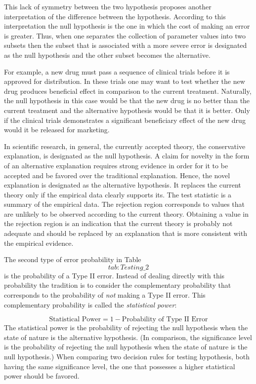 \documentclass[]{krantz}
\theoremstyle{definition}
\theoremstyle{definition}
\theoremstyle{definition}
\theoremstyle{remark}
\begin{document}
This lack of symmetry between the two hypothesis proposes another
interpretation of the difference between the hypothesis. According to
this interpretation the null hypothesis is the one in which the cost of
making an error is greater. Thus, when one separates the collection of
parameter values into two subsets then the subset that is associated
with a more severe error is designated as the null hypothesis and the
other subset becomes the alternative.

For example, a new drug must pass a sequence of clinical trials before
it is approved for distribution. In these trials one may want to test
whether the new drug produces beneficial effect in comparison to the
current treatment. Naturally, the null hypothesis in this case would be
that the new drug is no better than the current treatment and the
alternative hypothesis would be that it is better. Only if the clinical
trials demonstrates a significant beneficiary effect of the new drug
would it be released for marketing.

In scientific research, in general, the currently accepted theory, the
conservative explanation, is designated as the null hypothesis. A claim
for novelty in the form of an alternative explanation requires strong
evidence in order for it to be accepted and be favored over the
traditional explanation. Hence, the novel explanation is designated as
the alternative hypothesis. It replaces the current theory only if the
empirical data clearly supports its. The test statistic is a summary of
the empirical data. The rejection region corresponds to values that are
unlikely to be observed according to the current theory. Obtaining a
value in the rejection region is an indication that the current theory
is probably not adequate and should be replaced by an explanation that
is more consistent with the empirical evidence.

The second type of error probability in Table~\[tab:Testing\_2\] is the
probability of a Type II error. Instead of dealing directly with this
probability the tradition is to consider the complementary probability
that corresponds to the probability of \emph{not} making a Type II
error. This complementary probability is called the \emph{statistical
power}:

\[\mbox{Statistical Power} = 1 - \mbox{Probability of Type II Error}\]
The statistical power is the probability of rejecting the null
hypothesis when the state of nature is the alternative hypothesis. (In
comparison, the significance level is the probability of rejecting the
null hypothesis when the state of nature is the null hypothesis.) When
comparing two decision rules for testing hypothesis, both having the
same significance level, the one that possesses a higher statistical
power should be favored.
\end{document}
